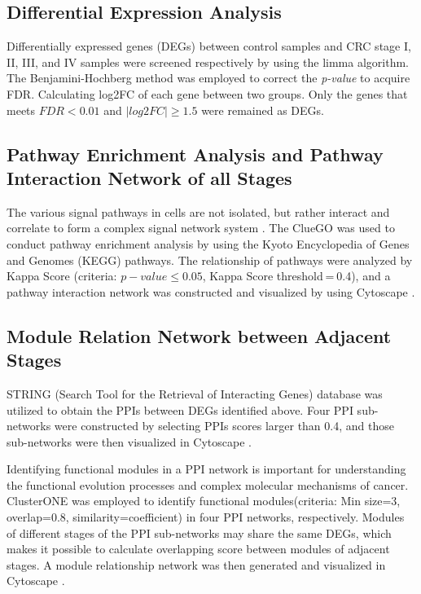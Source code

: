 \documentclass[conference]{IEEEtran}
\begin{document}
\subsection{Differential Expression Analysis}
Differentially expressed genes (DEGs) between control samples and CRC stage I, II, III, and IV samples were screened respectively by using the limma \cite{smyth2005limma} algorithm. 
The Benjamini-Hochberg \cite{ferreira2007benjamini} method was employed to correct  the \emph{p-value} to acquire FDR. 
Calculating log2FC of each gene between two groups. Only the genes that meets $FDR < 0.01$ and $|log2FC|\geqslant 1.5$ were remained as DEGs. 

\subsection{Pathway Enrichment Analysis and Pathway Interaction Network of all Stages}

The various signal pathways in cells are not isolated, 
but rather interact and correlate to form a complex signal network system \cite{cheong2011information}. 
The ClueGO \cite{bindea2009cluego} was used to conduct pathway enrichment analysis  by using the Kyoto Encyclopedia of Genes and Genomes (KEGG) pathways.
The relationship of pathways were analyzed by Kappa Score (criteria: $p-value\leqslant 0.05$, Kappa Score threshold = 0.4), 
and a pathway interaction network was constructed and visualized by using Cytoscape \cite{shannon2003cytoscape}.


\subsection{Module Relation Network between Adjacent Stages}

STRING (Search Tool for the Retrieval of Interacting Genes) \cite{szklarczyk2014string} database was utilized to obtain the PPIs between DEGs identified above. 
Four PPI sub-networks were constructed by selecting PPIs scores larger than 0.4, 
and those sub-networks were then visualized in Cytoscape \cite{shannon2003cytoscape}.


Identifying functional modules in a PPI network is important for understanding the functional evolution processes and complex molecular mechanisms of cancer. 
ClusterONE \cite{nepusz2012detecting} was employed to identify functional modules(criteria: Min size=3, overlap=0.8, similarity=coefficient) in four PPI networks, respectively. 
Modules of different stages of the PPI sub-networks may share the same DEGs,
which makes it possible to calculate overlapping score between modules of adjacent stages. 
A module relationship network was then generated and visualized in Cytoscape \cite{shannon2003cytoscape}. 
\end{document}
